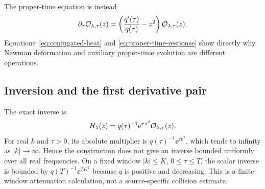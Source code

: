 The proper-time equation is instead
\begin{equation}
 \partial_\tau\mathcal O_{\lambda,\tau}(z)
 =\left(\frac{q'(\tau)}{q(\tau)}-z^2\right)
                         \mathcal O_{\lambda,\tau}(z).
 \label{eq:proper-time-response}
\end{equation}
Equations~\eqref{eq:conjugated-heat} and
\eqref{eq:proper-time-response} show directly why Newman deformation
and auxiliary proper-time evolution are different operations.

\subsection{Inversion and the first derivative pair}

The exact inverse is
\begin{equation}
 H_\lambda(z)=q(\tau)^{-1}\mathrm e^{\tau z^2}
                         \mathcal O_{\lambda,\tau}(z).
 \label{eq:inverse}
\end{equation}
For real $k$ and $\tau>0$, its absolute multiplier is
$q(\tau)^{-1}\ee^{\tau k^2}$, which tends to infinity as
$|k|\to\infty$. Hence the construction does not give an inverse
bounded uniformly over all real frequencies. On a fixed window
$|k|\le K$, $0\le\tau\le T$, the scalar inverse is bounded by
$q(T)^{-1}\ee^{TK^2}$ because $q$ is positive and decreasing.
This is a finite-window attenuation calculation, not a source-specific
collision estimate.

